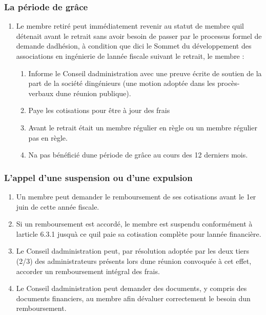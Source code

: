 \subsubsection{La période de grâce}
\label{la-periode-de-grace}

\begin{enumerate}
 \item
  Le membre retiré peut immédiatement revenir au statut de membre qu\textquotesingle il détenait avant le retrait sans avoir besoin de passer par le processus formel de demande d\textquotesingle adhésion, à condition que d\textquotesingle ici le Sommet du développement des associations en ingénierie de l\textquotesingle année fiscale suivant le retrait, le membre :

  \begin{enumerate}
   \item
    Informe le Conseil d\textquotesingle administration avec une preuve écrite de soutien de la part de la société d\textquotesingle ingénieurs (une motion adoptée dans les procès-verbaux d\textquotesingle une réunion publique).
   \item
    Paye les cotisations pour être à jour des frais
   \item
    Avant le retrait était un membre régulier en règle ou un membre régulier pas en règle.
   \item
    N\textquotesingle a pas bénéficié d\textquotesingle une période de grâce au cours des 12 derniers mois.
  \end{enumerate}
\end{enumerate}

\subsubsection{L'appel d'une suspension ou d'une expulsion}
\label{lappel-dune-suspension-ou-dune-expulsion}

\begin{enumerate}
 \item
  Un membre peut demander le remboursement de ses cotisations avant le 1er juin de cette année fiscale.
 \item
  Si un remboursement est accordé, le membre est suspendu conformément à l\textquotesingle article 6.3.1 jusqu\textquotesingle à ce qu\textquotesingle il paie sa cotisation complète pour l\textquotesingle année financière.
 \item
  Le Conseil d\textquotesingle administration peut, par résolution adoptée par les deux tiers (2/3) des administrateurs présents lors d\textquotesingle une réunion convoquée à cet effet, accorder un remboursement intégral des frais.
 \item
  Le Conseil d\textquotesingle administration peut demander des documents, y compris des documents financiers, au membre afin d\textquotesingle évaluer correctement le besoin d\textquotesingle un remboursement.
\end{enumerate}

